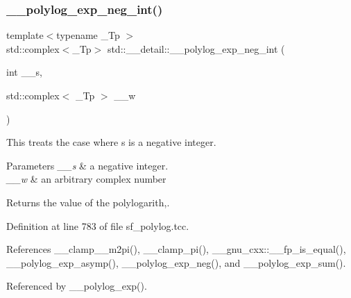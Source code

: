 \subsubsection{\texorpdfstring{\+\_\+\+\_\+polylog\+\_\+exp\+\_\+neg\+\_\+int()}{\_\_polylog\_exp\_neg\_int()}\hspace{0.1cm}{\footnotesize\ttfamily [1/2]}}
{\footnotesize\ttfamily template$<$typename \+\_\+\+Tp $>$ \\
std\+::complex$<$\+\_\+\+Tp$>$ std\+::\+\_\+\+\_\+detail\+::\+\_\+\+\_\+polylog\+\_\+exp\+\_\+neg\+\_\+int (\begin{DoxyParamCaption}\item[{int}]{\+\_\+\+\_\+s,  }\item[{std\+::complex$<$ \+\_\+\+Tp $>$}]{\+\_\+\+\_\+w }\end{DoxyParamCaption})}

This treats the case where s is a negative integer.


\begin{DoxyParams}{Parameters}
{\em \+\_\+\+\_\+s} & a negative integer. \\
\hline
{\em \+\_\+\+\_\+w} & an arbitrary complex number \\
\hline
\end{DoxyParams}
\begin{DoxyReturn}{Returns}
the value of the polylogarith,. 
\end{DoxyReturn}


Definition at line 783 of file sf\+\_\+polylog.\+tcc.



References \+\_\+\+\_\+clamp\+\_\+\_\+m2pi(), \+\_\+\+\_\+clamp\+\_\+pi(), \+\_\+\+\_\+gnu\+\_\+cxx\+::\+\_\+\+\_\+fp\+\_\+is\+\_\+equal(), \+\_\+\+\_\+polylog\+\_\+exp\+\_\+asymp(), \+\_\+\+\_\+polylog\+\_\+exp\+\_\+neg(), and \+\_\+\+\_\+polylog\+\_\+exp\+\_\+sum().



Referenced by \+\_\+\+\_\+polylog\+\_\+exp().

\mbox{\label{namespacestd_1_1____detail_a7a186c84c1673a2beabba25c91119c66}} 
